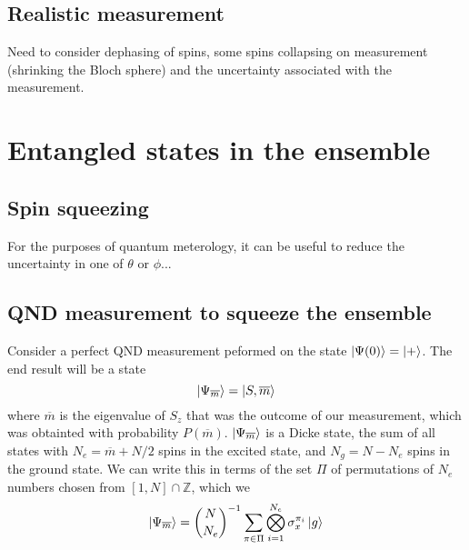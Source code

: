 \documentclass{article}
\newcommand*\meas[1]{\overline{#1}}
\begin{document}
\subsection{Realistic measurement}


Need to consider dephasing of spins, some spins collapsing on measurement
(shrinking the Bloch sphere) and the uncertainty associated with the
measurement.

\section{Entangled states in the ensemble}


\subsection{Spin squeezing}


For the purposes of quantum meterology, it can be useful to reduce the
uncertainty in one of $\theta$ or $\phi$...

\subsection{QND measurement to squeeze the ensemble}



Consider a perfect QND measurement peformed on the state $\ket{\Psi(0)} =
\ket{+}$. The end result will be a state
%
\begin{equation}
  \ket{\Psi_{\meas{m}}} = \ket{S, \meas{m}}
\end{equation}
%
where $\meas{m}$ is the eigenvalue of $S_z$ that was the outcome of our
measurement, which was obtainted with probability $P(\meas{m})$.
$\ket{\Psi_{\meas{m}}}$ is a Dicke state, the sum of all states with
$N_e = \meas{m} + N/2$ spins in the excited state, and $N_g = N - N_e$ spins in
the ground state.  We can write this in terms of the set $\Pi$  of permutations 
of $N_e$ numbers chosen from $[1,N]\cap\mathbb{Z}$, which we
\begin{equation}
  \ket{\Psi_{\meas{m}}} = {N \choose N_e}^{-1}\sum_{\pi \in \Pi}
  \bigotimes_{i=1}^{N_e} \sigma_x^{\pi_i} \ket{g}
\end{equation}
\end{document}
